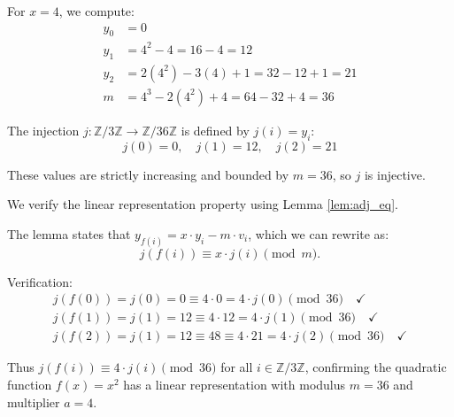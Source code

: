 \begin{example}
For $x = 4$, we compute:
\begin{align*}
y_0 &= 0 \\
y_1 &= 4^2 - 4 = 16 - 4 = 12 \\
y_2 &= 2(4^2) - 3(4) + 1 = 32 - 12 + 1 = 21 \\
m &= 4^3 - 2(4^2) + 4 = 64 - 32 + 4 = 36
\end{align*}

The injection $j: \mathbb{Z}/3\mathbb{Z} \to \mathbb{Z}/36\mathbb{Z}$ is defined by $j(i) = y_i$:
$$j(0) = 0, \quad j(1) = 12, \quad j(2) = 21$$

These values are strictly increasing and bounded by $m = 36$, so $j$ is injective.

We verify the linear representation property using Lemma \ref{lem:adj_eq}. 

The lemma states that $y_{f(i)} = x \cdot y_i - m \cdot v_i$, which we can rewrite as:
$$j(f(i)) \equiv x \cdot j(i) \pmod{m}.$$

Verification:
\begin{align*}
j(f(0)) = j(0) = 0 \equiv 4 \cdot 0 = 4 \cdot j(0) \pmod{36} \quad\checkmark \\
j(f(1)) = j(1) = 12 \equiv 4 \cdot 12 = 4 \cdot j(1) \pmod{36} \quad\checkmark \\
j(f(2)) = j(1) = 12 \equiv 48 \equiv 4 \cdot 21 = 4 \cdot j(2) \pmod{36} \quad\checkmark
\end{align*}

Thus $j(f(i)) \equiv 4 \cdot j(i) \pmod{36}$ for all $i \in \mathbb{Z}/3\mathbb{Z}$, confirming the quadratic function $f(x) = x^2$ has a linear representation with modulus $m = 36$ and multiplier $a = 4$.
\end{example}
